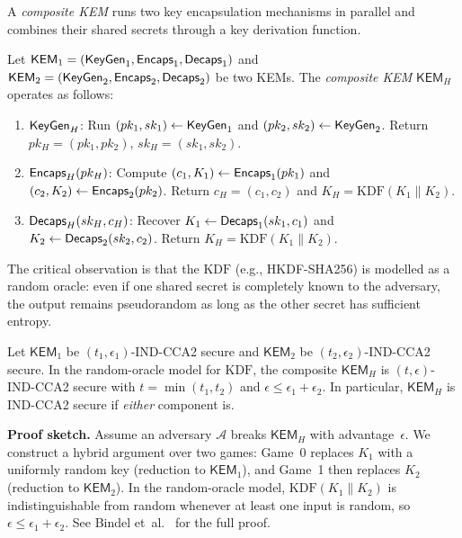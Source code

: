 A \emph{composite KEM} runs two key encapsulation mechanisms in parallel and combines their shared secrets through a key derivation function.

\begin{definition}
\label{def:composite-kem}
Let $\mathsf{KEM}_1 = (\mathsf{KeyGen}_1, \mathsf{Encaps}_1, \mathsf{Decaps}_1)$ and $\mathsf{KEM}_2 = (\mathsf{KeyGen}_2, \mathsf{Encaps}_2, \mathsf{Decaps}_2)$ be two KEMs.  The \emph{composite KEM} $\mathsf{KEM}_H$ operates as follows:
\begin{enumerate}
\item $\mathsf{KeyGen}_H$: Run $(pk_1, sk_1) \gets \mathsf{KeyGen}_1$ and $(pk_2, sk_2) \gets \mathsf{KeyGen}_2$.  Return $pk_H = (pk_1, pk_2)$, $sk_H = (sk_1, sk_2)$.
\item $\mathsf{Encaps}_H(pk_H)$: Compute $(c_1, K_1) \gets \mathsf{Encaps}_1(pk_1)$ and $(c_2, K_2) \gets \mathsf{Encaps}_2(pk_2)$.  Return $c_H = (c_1, c_2)$ and $K_H = \mathrm{KDF}(K_1 \| K_2)$.
\item $\mathsf{Decaps}_H(sk_H, c_H)$: Recover $K_1 \gets \mathsf{Decaps}_1(sk_1, c_1)$ and $K_2 \gets \mathsf{Decaps}_2(sk_2, c_2)$.  Return $K_H = \mathrm{KDF}(K_1 \| K_2)$.
\end{enumerate}
\end{definition}

The critical observation is that the $\mathrm{KDF}$ (e.g., HKDF-SHA256) is modelled as a random oracle: even if one shared secret is completely known to the adversary, the output remains pseudorandom as long as the other secret has sufficient entropy.

\begin{theorem}
\label{thm:hybrid-kem-security}
Let $\mathsf{KEM}_1$ be $(t_1, \epsilon_1)$-IND-CCA2 secure and $\mathsf{KEM}_2$ be $(t_2, \epsilon_2)$-IND-CCA2 secure.  In the random-oracle model for $\mathrm{KDF}$, the composite $\mathsf{KEM}_H$ is $(t, \epsilon)$-IND-CCA2 secure with $t = \min(t_1, t_2)$ and $\epsilon \leq \epsilon_1 + \epsilon_2$.  In particular, $\mathsf{KEM}_H$ is IND-CCA2 secure if \emph{either} component is.
\end{theorem}

\begin{svgraybox}
\textbf{Proof sketch.}  Assume an adversary $\mathcal{A}$ breaks $\mathsf{KEM}_H$ with advantage~$\epsilon$.  We construct a hybrid argument over two games: Game~0 replaces $K_1$ with a uniformly random key (reduction to $\mathsf{KEM}_1$), and Game~1 then replaces $K_2$ (reduction to $\mathsf{KEM}_2$).  In the random-oracle model, $\mathrm{KDF}(K_1 \| K_2)$ is indistinguishable from random whenever at least one input is random, so $\epsilon \leq \epsilon_1 + \epsilon_2$.  See Bindel et~al.~\cite{Bindel2019} for the full proof.
\end{svgraybox}


